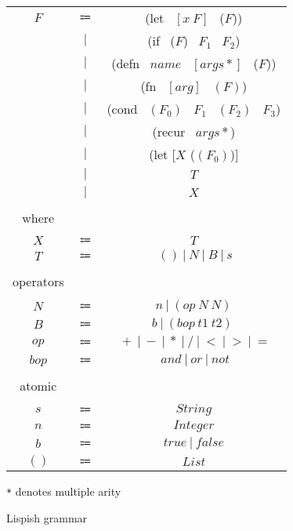 \begin{figure}[ht]
\centering
\begin{tabular}{ c c c }
$F$ & $\Coloneqq$ & (let \ $[x \ F]$ \ ($F$)) \\
 & $|$ & (if \ ($F$) \ $F_1$ \ $F_2$) \\
 & $|$ & (defn \ $name$ \ $[args*]$ \ ($F$)) \\
 & $|$ & (fn \ $[arg]$ \ $(F)$) \\
 & $|$ & (cond \ $(F_0)$ \ $F_1$ \ $(F_2)$ \ $F_3$) \\
 & $|$ & (recur \ $args*$) \\
 & $|$ & (let [$X$ ($(F_0)$)]  \\
 & $|$ & $T$ \\
 & $|$ & $X$ \\
 & & \\
where & & \\
 & & \\
$X$ & $\Coloneqq$ & $T$ \\
$T$ & $\Coloneqq$ & $ \ () \ \vert \ N \ \vert \ B \ \vert \ s $ \\
& & \\
operators & & \\
 & & \\
$N$ & $\Coloneqq$ & $ n \ \vert \ (op \ N \ N) $ \\
$B$ & $\Coloneqq$ & $ b \ \vert \ (bop \ t1 \ t2) \ $ \\
$op$ & $\Coloneqq$ & $ \ + \ \vert \ - \ \vert \ * \ \vert \ / \ \vert \ < \ \vert \ > \ \vert \ =$\\
$bop$ & $\Coloneqq$ & $ \ and \ \vert \ or \ \vert \ not$ \\
& & \\
atomic & & \\
 & & \\
$s$ & $\Coloneqq$ & $ String $ \\
$n$ & $\Coloneqq$ & $ Integer $ \\
$b$ & $\Coloneqq$ & $ true \ \vert \ false $ \\
$()$ & $\Coloneqq$ & $ List $ \\
\end{tabular}
\texttt{*} denotes multiple arity 

\caption{Lispish grammar}
\label{fig:lispish-grammar}
\end{figure}